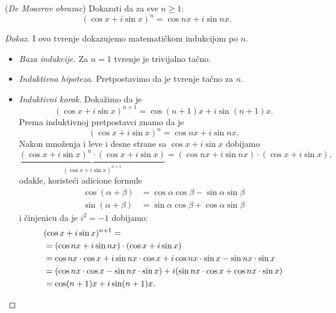 \begin{EX}
  (\textit{De Moavrov obrazac})
  Dokazati da za sve $n \ge 1$:
  $$
    (\cos x + i \sin x)^n = \cos nx + i \sin nx.
  $$
\end{EX}
\begin{proof}[Dokaz]
  I ovo tvr\dj enje dokazujemo matemati\v ckom indukcijom po $n$.
  \begin{itemize}\itemsep -1pt
  \item
    \emph{Baza indukcije.} Za $n = 1$ tvr\dj enje je trivijalno ta\v cno.
  
  \item
    \emph{Induktivna hipoteza.} Pretpostavimo da je tvr\dj enje ta\v cno za $n$.
  \item
    \emph{Induktivni korak.} Doka\v zimo da je
    $$
      (\cos x + i \sin x)^{n+1} = \cos (n + 1)x + i \sin (n + 1)x.
    $$
    Prema induktivnoj pretpostavci znamo da je
    $$
      (\cos x + i \sin x)^n = \cos nx + i \sin nx.
    $$
    Nakon mno\v zenja i leve i desne strane sa $\cos x + i \sin x$ dobijamo
    $$
      \underbrace{(\cos x + i \sin x)^n \cdot (\cos x + i \sin x)}_{(\cos x + i \sin x)^{n + 1}} = (\cos nx + i \sin nx) \cdot (\cos x + i \sin x),
    $$
    odakle, koriste\'ci adicione formule
    \begin{align*}
      \cos(\alpha + \beta) &= \cos \alpha \cos \beta - \sin \alpha \sin \beta\\
      \sin(\alpha + \beta) &= \sin \alpha \cos \beta + \cos \alpha \sin \beta
    \end{align*}
    i \v cinjenicu da je $i^2 = -1$ dobijamo:
    \begin{align*}
      &(\cos x + i \sin x)^{n + 1} = \\
      & = (\cos nx + i \sin nx) \cdot (\cos x + i \sin x)\\
      & = \cos nx \cdot \cos x + i \sin nx \cdot \cos x + i \cos nx \cdot \sin x - \sin nx \cdot \sin x\\
      & = (\cos nx \cdot \cos x  - \sin nx \cdot \sin x) + i (\sin nx \cdot \cos x + \cos nx \cdot \sin x)\\
      & = \cos (n + 1)x + i \sin (n + 1)x.\qedhere
    \end{align*}
  \end{itemize}
\end{proof}


